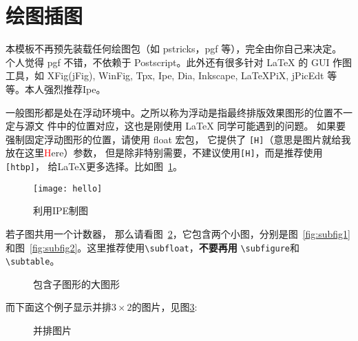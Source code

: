 \section{绘图插图}

本模板不再预先装载任何绘图包（如 \textsf{pstricks，pgf} 等），完全由你自己来决定。
个人觉得 \textsf{pgf} 不错，不依赖于 Postscript。此外还有很多针对 \LaTeX{} 的
 GUI 作图工具，如 XFig(jFig), WinFig, Tpx, Ipe, Dia, Inkscape, LaTeXPiX,
jPicEdt 等等。本人强烈推荐\textsf{Ipe}。

一般图形都是处在浮动环境中。之所以称为浮动是指最终排版效果图形的位置不一定与源文
件中的位置对应，这也是刚使用 \LaTeX{} 同学可能遇到的问题。
如果要强制固定浮动图形的位置，请使用 \textsf{float} 宏包，
它提供了 \texttt{[H]}（意思是图片就给我放在这里\textcolor{red}{H}ere）参数，
但是除非特别需要，不建议使用\texttt{[H]}，而是推荐使用\texttt{[htbp]}，
给\LaTeX{}更多选择。比如图~\ref{fig:ipe}。
\begin{figure}[htbp] %
  \centering
  \texttt{[image: hello]}
  \caption{利用IPE制图}
  \label{fig:ipe}
\end{figure}

若子图共用一个计数器，
那么请看图~\ref{fig:big1}，它包含两个小图，分别是图~\ref{fig:subfig1} 
和图~\ref{fig:subfig2}。这里推荐使用\verb|\subfloat|，{\bf 不要再用}
\verb|\subfigure|和\verb|\subtable|。
\begin{figure}[htb]
  \centering%
  \subfloat[第一个小图形]{%
    \label{fig:subfig1}
    \texttt{[image: xh]}}\hspace{4em}%
  \caption{包含子图形的大图形}
  \label{fig:big1}
\end{figure}

而下面这个例子显示并排$3\times2$的图片，见图\ref{fig:subfig:3x2}:
\begin{figure}[htb]
\centering
{} \qquad
{} \qquad
{} \qquad
{} \qquad
{} \qquad
{}
\caption{并排图片}
\label{fig:subfig:3x2}
\end{figure}

